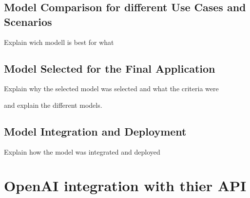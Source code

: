 \subsection{Model Comparison for different Use Cases and Scenarios}

Explain wich modell is best for what

\subsection{Model Selected for the Final Application}

Explain why the selected model was selected and what the criteria were

and explain the different models.

\subsection{Model Integration and Deployment}

Explain how the model was integrated and deployed

\section{OpenAI integration with thier API}








